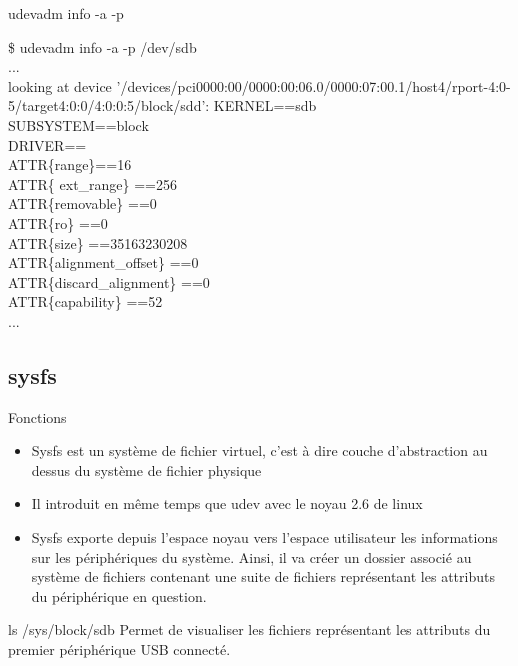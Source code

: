 \documentclass{beamer}
\begin{document}
\begin{frame}
\begin{exampleblock}{udevadm info -a -p} 

\tiny{\$  udevadm info -a -p /dev/sdb\\
...\\
looking at device '/devices/pci0000:00/0000:00:06.0/0000:07:00.1/host4/rport-4:0-5/target4:0:0/4:0:0:5/block/sdd':
KERNEL==sdb\\    
    SUBSYSTEM==block\\
    DRIVER==\\

	
  ATTR\{range\}==16\\
 ATTR\{ ext\_range\} ==256\\
    ATTR\{removable\} ==0\\
    ATTR\{ro\} ==0\\
    ATTR\{size\} ==35163230208\\
    ATTR\{alignment\_offset\} ==0\\
    ATTR\{discard\_alignment\} ==0\\
    ATTR\{capability\} ==52\\
...
}

		
		
\end{exampleblock}
 
\end{frame}






\subsection{sysfs}

\begin{frame}
\begin{block}{Fonctions} 
	\begin{itemize}
		[circle]
		\item Sysfs est un système de fichier virtuel, c'est à dire couche d'abstraction au dessus du système de fichier physique
		\item Il introduit en même temps que udev avec le noyau 2.6 de linux 
		\item Sysfs exporte depuis l'espace noyau vers l'espace utilisateur les informations 
		sur les périphériques du système. Ainsi, il va créer un dossier associé au système de fichiers contenant une 
		suite de fichiers représentant les attributs du périphérique en question. 
	\end{itemize}
\end{block}

\begin{exampleblock}{ls /sys/block/sdb} 
	Permet de visualiser les fichiers représentant les attributs du premier périphérique USB connecté.
\end{exampleblock}
\end{frame}
\end{document}

